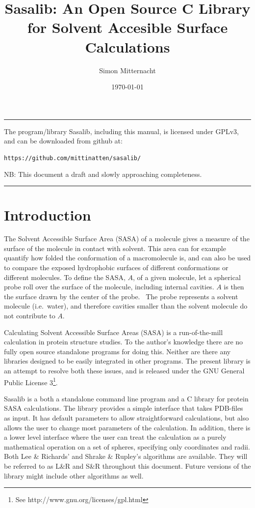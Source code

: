 \documentclass[a4paper,11pt]{article}
\author{Simon Mitternacht}
\date{\today}
\title{Sasalib: An Open Source C Library for Solvent Accesible Surface
  Calculations}
\begin{document}
\maketitle
\hrule\vspace{0.5cm}
\noindent
The program/library Sasalib, including this manual, is licensed under
GPLv3, and can be downloaded from github at: 
\begin{center}
\texttt{https://github.com/mittinatten/sasalib/}
\end{center}
NB: This document a draft and slowly approaching completeness.
\vspace{0.5cm}
\hrule
\section{Introduction}
The Solvent Accessible Surface Area (SASA) of a molecule gives a
measure of the surface of the molecule in contact with solvent. This
area can for example quantify how folded the conformation of a
macromolecule is, and can also be used to compare the exposed
hydrophobic surfaces of different conformations or different
molecules. To define the SASA, $A$, of a given molecule, let a spherical
probe roll over the surface of the molecule, including internal
cavities. $A$ is then the surface drawn by the center of the
probe.~\cite{LnR} The probe represents a solvent molecule
(i.e.\ water), and therefore cavities smaller than the solvent
molecule do not contribute to $A$.

Calculating Solvent Accessible Surface Areas (SASA) is a
run-of-the-mill calculation in protein structure studies. To the
author's knowledge there are no fully open source standalone programs
for doing this. Neither are there any libraries designed to be easily
integrated in other programs. The present library is an attempt to
resolve both these issues, and is released under the GNU General
Public License 3\footnote{See http://www.gnu.org/licenses/gpl.html}.

Sasalib is a both a standalone command line program and a C library
for protein SASA calculations. The library provides a simple interface
that takes PDB-files as input. It has default parameters to allow
straightforward calculations, but also allows the user to change most
parameters of the calculation. In addition, there is a lower level
interface where the user can treat the calculation as a purely
mathematical operation on a set of spheres, specifying only
coordinates and radii. Both Lee \& Richards' \cite{LnR} and Shrake \&
Rupley's \cite{SnR} algorithms are available. They will be referred to
as L\&R and S\&R throughout this document. Future versions of the
library might include other algorithms as well.
\end{document}
